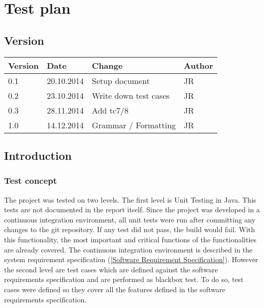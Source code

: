 
\chapter{Test plan} %

\label{Test plan} %



\section{Version}

\begin{tabular}{| p{1.5cm} | p{2cm} | p{9cm} | p{1.5cm} |}
    \hline
    Version & Date      & Change & Author \\ \hline
    0.1     & 20.10.2014        & Setup document                                        & JR \\ \hline
    0.2     & 23.10.2014        & Write down test cases                                        & JR \\ \hline
    0.3     & 28.11.2014        & Add tc7/8                                        & JR \\ \hline
    1.0     & 14.12.2014        & Grammar / Formatting                                        & JR \\ \hline
\end{tabular}


\section{Introduction}


\subsection{Test concept}

The project was tested on two levels. The first level is Unit Testing in Java. This tests are not documented in the report itself. Since the project was developed in a continuous integration environment, all unit tests were run after committing any changes to the git repository. If any test did not pass, the build would fail. With this functionality, the most important and critical functions of the functionalities are already covered. The continuous integration environment is described in the system requirement specification (\ref{Software Requirement Specification}). \linebreak 
However the second level are test cases which are defined against the software requirements specification and are performed as blackbox test.  To do so, test cases were defined so they cover all the features defined in the software requirements specification. 

